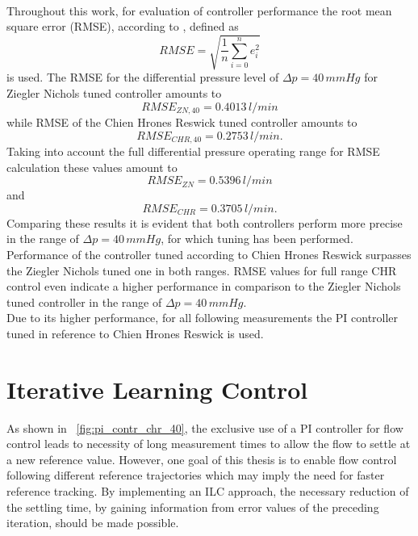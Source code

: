 \\Throughout this work, for evaluation of controller performance the root mean square error (RMSE), according to \cite{RMSE}, defined as
\begin{equation}
  RMSE = \sqrt{\frac{1}{n}\sum_{i=0}^n e_i^2}
\end{equation}
is used. The RMSE for the differential pressure level of $\Delta{p}=40\,mmHg$ for Ziegler Nichols tuned controller amounts to
\begin{equation}
  RMSE_{ZN,40}=0.4013\,l/min
\end{equation}
while RMSE of the Chien Hrones Reswick tuned controller amounts to
\begin{equation}
  RMSE_{CHR,40}=0.2753\,l/min.
\end{equation}
Taking into account the full differential pressure operating range for RMSE calculation these values amount to
\begin{equation}
  RMSE_{ZN}=0.5396\,l/min
\end{equation}
and
\begin{equation}
  RMSE_{CHR}=0.3705\,l/min.
\end{equation}
Comparing these results it is evident that both controllers perform more precise in the range of $\Delta{p}=40\,mmHg$, for which tuning has been performed.
Performance of the controller tuned according to Chien Hrones Reswick surpasses the Ziegler Nichols tuned one in both ranges. RMSE values for full range CHR control even indicate a higher performance in comparison to the Ziegler Nichols tuned controller in the range of $\Delta{p}=40\,mmHg$.
\\ Due to its higher performance, for all following measurements the PI controller tuned in reference to Chien Hrones Reswick is used.
\section{Iterative Learning Control}
As shown in \figurename~\ref{fig:pi_contr_chr_40}, the exclusive use of a PI controller for flow control leads to necessity of long measurement times to allow the flow to settle at a new reference value. However, one goal of this thesis is to enable flow control following different reference trajectories which may imply the need for faster reference tracking. By implementing an ILC approach, the necessary reduction of the settling time, by gaining information from error values of the preceding iteration, should be made possible.
